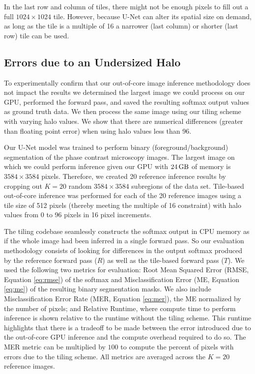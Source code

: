 \documentclass[10pt, indentfirst]{article}
\begin{document}
In the last row and column of tiles, there might not be enough pixels to fill out a full $1024 \times 1024$ tile. However, because U-Net can alter its spatial size on demand, as long as the tile is a multiple of 16 a narrower (last column) or shorter (last row) tile can be used. 


\subsection{Errors due to an Undersized Halo}

To experimentally confirm that our out-of-core image inference methodology does not impact the results we determined the largest image we could process on our GPU, performed the forward pass, and saved the resulting softmax output values as ground truth data. We then process the same image using our tiling scheme with varying halo values. We show that there are numerical differences (greater than floating point error) when using halo values less than 96. 

Our U-Net model was trained to perform binary (foreground/background) segmentation of the phase contrast microscopy images. The largest image on which we could perform inference given our GPU with $\SI{24}{\giga\byte}$ of memory is $3584 \times 3584$ pixels. Therefore, we created 20 reference inference results by cropping out $K = 20$ random $3584 \times 3584$ subregions of the data set. 
Tile-based out-of-core inference was performed for each of the 20 reference images using a tile size of 512 pixels (thereby meeting the multiple of 16 constraint) with halo values from 0 to 96 pixels in 16 pixel increments. 

The tiling codebase seamlessly constructs the softmax output in CPU memory as if the whole image had been inferred in a single forward pass. So our evaluation methodology consists of looking for differences in the output softmax produced by the reference forward pass ($R$) as well as the tile-based forward pass ($T$). We used the following two metrics for evaluation: Root Mean Squared Error (RMSE, Equation \ref{eq:rmse}) of the softmax and Misclassification Error (ME, Equation \ref{eq:me}) of the resulting binary segmentation masks. %
We also include Misclassification Error Rate (MER, Equation \ref{eq:mer}), the ME normalized by the number of pixels; and Relative Runtime, where compute time to perform inference is shown relative to the runtime without the tiling scheme. This runtime highlights that there is a tradeoff to be made between the error introduced due to the out-of-core GPU inference and the compute overhead required to do so. The MER metric can be multiplied by $100$ to compute the percent of pixels with errors due to the tiling scheme.
All metrics are averaged across the $K = 20$ reference images.
\end{document}
